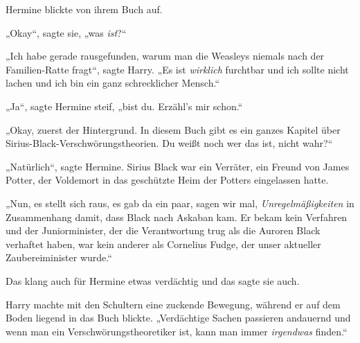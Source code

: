 Hermine blickte von ihrem Buch auf.

„Okay“, sagte sie, „was \emph{ist}?“

„Ich habe gerade rausgefunden, warum man die Weasleys niemals nach der Familien-Ratte fragt“, sagte Harry.
„Es ist \emph{wirklich} furchtbar und ich sollte nicht lachen und ich bin ein ganz schrecklicher Mensch.“

„Ja“, sagte Hermine steif, „bist du. Erzähl’s mir schon.“

„Okay, zuerst der Hintergrund. In diesem Buch gibt es ein ganzes Kapitel über Sirius-Black-Verschwörungstheorien. Du weißt noch wer das ist, nicht wahr?“

„Natürlich“, sagte Hermine. Sirius Black war ein Verräter, ein Freund von James Potter, der Voldemort in das geschützte Heim der Potters eingelassen hatte.

„Nun, es stellt sich raus, es gab da ein paar, sagen wir mal, \emph{Unregelmäßigkeiten} in Zusammenhang damit, dass Black nach Askaban kam. Er bekam kein Verfahren und der Juniorminister, der die Verantwortung trug als die Auroren Black verhaftet haben, war kein anderer als Cornelius Fudge, der unser aktueller Zaubereiminister wurde.“

Das klang auch für Hermine etwas verdächtig und das sagte sie auch.

Harry machte mit den Schultern eine zuckende Bewegung, während er auf dem Boden liegend in das Buch blickte.
„Verdächtige Sachen passieren andauernd und wenn man ein Verschwörungstheoretiker ist, kann man immer \emph{irgendwas} finden.“

